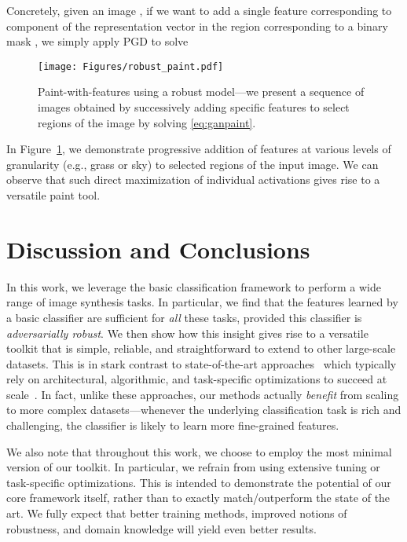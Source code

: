 \documentclass{article}
\begin{document}
{Concretely, given an
image , if we want to add a single feature corresponding to component  of
the representation vector  in the region corresponding to a binary mask
, we simply apply PGD to solve

\begin{figure}[!h]
	\texttt{[image: Figures/robust\_paint.pdf]}
	\caption{Paint-with-features using a robust model---we present a
	sequence of images obtained by successively adding specific features to 
    select regions of the image by solving \eqref{eq:ganpaint}.}
	\label{fig:robpaint}
\end{figure}
In Figure~\ref{fig:robpaint}, we demonstrate progressive addition of features at various levels of
granularity (e.g., grass or sky) to selected regions of the input image. We can observe that
such direct maximization of individual activations gives rise to a versatile
paint tool. 
 
\section{Discussion and Conclusions}
In this work, we leverage the basic classification framework to perform a wide
range of image synthesis tasks. In particular, we find that the features learned
by a basic classifier are sufficient for {\em all} these tasks, provided this
classifier is {\em adversarially robust}. We then show how this insight gives
rise to a versatile toolkit that is simple, reliable, and
straightforward to extend to other large-scale datasets. This is in stark contrast
to state-of-the-art
approaches~\cite{goodfellow2014generative,karras2018progressive,brock2019large}
which typically rely on architectural, algorithmic, and task-specific
optimizations to succeed at
scale~\cite{salimans2016improved,daskalakis2018training,miyato2018spectral}. In
fact, unlike these approaches, our methods actually {\em benefit} from scaling
to more complex datasets---whenever the underlying classification task is rich
and challenging, the classifier is likely to learn more fine-grained features.

We also note that throughout this work, we choose to employ the most minimal
version of our toolkit. In particular, we refrain from using extensive tuning or
task-specific optimizations. This is intended to demonstrate the potential of
our core framework itself, rather than to exactly match/outperform the state of
the art. We fully expect that better training methods, improved notions of
robustness, and domain knowledge will yield even better results.

}
\end{document}
